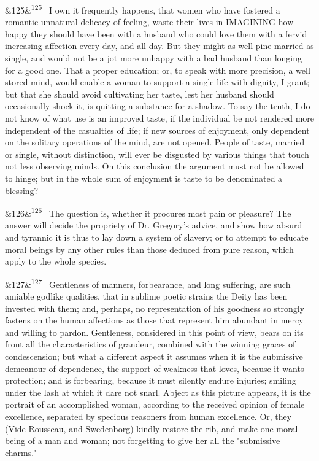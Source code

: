 \documentclass[12pt]{article}
\newcommand{\para}[1][]{\par\noindent\ifx&#1&\else\textsuperscript{\footnotesize #1}~\fi}
\begin{document}
\para[125] I own it frequently happens, that women who have fostered a romantic unnatural delicacy of feeling, waste their lives in IMAGINING how happy they should have been with a husband who could love them with a fervid increasing affection every day, and all day. But they might as well pine married as single, and would not be a jot more unhappy with a bad husband than longing for a good one. That a proper education; or, to speak with more precision, a well stored mind, would enable a woman to support a single life with dignity, I grant; but that she should avoid cultivating her taste, lest her husband should occasionally shock it, is quitting a substance for a shadow. To say the truth, I do not know of what use is an improved taste, if the individual be not rendered more independent of the casualties of life; if new sources of enjoyment, only dependent on the solitary operations of the mind, are not opened. People of taste, married or single, without distinction, will ever be disgusted by various things that touch not less observing minds. On this conclusion the argument must not be allowed to hinge; but in the whole sum of enjoyment is taste to be denominated a blessing?

\para[126] The question is, whether it procures most pain or pleasure? The answer will decide the propriety of Dr. Gregory's advice, and show how absurd and tyrannic it is thus to lay down a system of slavery; or to attempt to educate moral beings by any other rules than those deduced from pure reason, which apply to the whole species.

\para[127] Gentleness of manners, forbearance, and long suffering, are such amiable godlike qualities, that in sublime poetic strains the Deity has been invested with them; and, perhaps, no representation of his goodness so strongly fastens on the human affections as those that represent him abundant in mercy and willing to pardon. Gentleness, considered in this point of view, bears on its front all the characteristics of grandeur, combined with the winning graces of condescension; but what a different aspect it assumes when it is the submissive demeanour of dependence, the support of weakness that loves, because it wants protection; and is forbearing, because it must silently endure injuries; smiling under the lash at which it dare not snarl. Abject as this picture appears, it is the portrait of an accomplished woman, according to the received opinion of female excellence, separated by specious reasoners from human excellence. Or, they (Vide Rousseau, and Swedenborg) kindly restore the rib, and make one moral being of a man and woman; not forgetting to give her all the "submissive charms."
\end{document}
